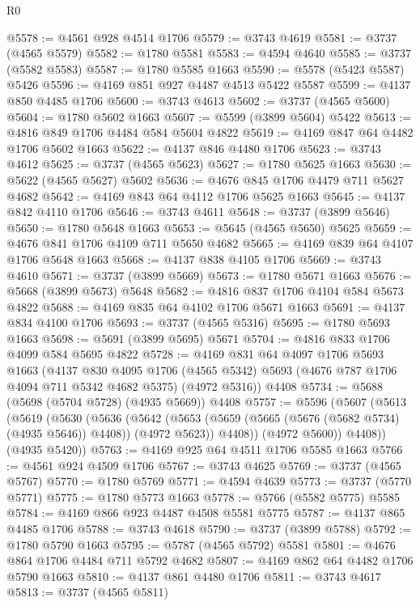 \begin{lexlean}{R0}
\begin{coremodule}
@5578 := @4561 @928 @4514 @1706
@5579 := @3743 @4619
@5581 := @3737 (@4565 @5579)
@5582 := @1780 @5581
@5583 := @4594 @4640
@5585 := @3737 (@5582 @5583)
@5587 := @1780 @5585 @1663
@5590 := @5578 (@5423 @5587) @5426
@5596 := @4169 @851 @927 @4487 @4513 @5422 @5587
@5599 := @4137 @850 @4485 @1706
@5600 := @3743 @4613
@5602 := @3737 (@4565 @5600)
@5604 := @1780 @5602 @1663
@5607 := @5599 (@3899 @5604) @5422
@5613 := @4816 @849 @1706 @4484 @584 @5604 @4822
@5619 := @4169 @847 @64 @4482 @1706 @5602 @1663
@5622 := @4137 @846 @4480 @1706
@5623 := @3743 @4612
@5625 := @3737 (@4565 @5623)
@5627 := @1780 @5625 @1663
@5630 := @5622 (@4565 @5627) @5602
@5636 := @4676 @845 @1706 @4479 @711 @5627 @4682
@5642 := @4169 @843 @64 @4112 @1706 @5625 @1663
@5645 := @4137 @842 @4110 @1706
@5646 := @3743 @4611
@5648 := @3737 (@3899 @5646)
@5650 := @1780 @5648 @1663
@5653 := @5645 (@4565 @5650) @5625
@5659 := @4676 @841 @1706 @4109 @711 @5650 @4682
@5665 := @4169 @839 @64 @4107 @1706 @5648 @1663
@5668 := @4137 @838 @4105 @1706
@5669 := @3743 @4610
@5671 := @3737 (@3899 @5669)
@5673 := @1780 @5671 @1663
@5676 := @5668 (@3899 @5673) @5648
@5682 := @4816 @837 @1706 @4104 @584 @5673 @4822
@5688 := @4169 @835 @64 @4102 @1706 @5671 @1663
@5691 := @4137 @834 @4100 @1706
@5693 := @3737 (@4565 @5316)
@5695 := @1780 @5693 @1663
@5698 := @5691 (@3899 @5695) @5671
@5704 := @4816 @833 @1706 @4099 @584 @5695 @4822
@5728 := @4169
    @831
    @64
    @4097
    @1706
    @5693
    @1663
    (@4137
      @830
      @4095
      @1706
      (@4565 @5342)
      @5693
      (@4676 @787 @1706 @4094 @711 @5342 @4682 @5375)
      (@4972 @5316))
    @4408
@5734 := @5688 (@5698 (@5704 @5728) (@4935 @5669)) @4408
@5757 := @5596
    (@5607
      (@5613
        (@5619
          (@5630
            (@5636
              (@5642
                (@5653 (@5659 (@5665 (@5676 (@5682 @5734) (@4935 @5646)) @4408)) (@4972 @5623))
                @4408))
            (@4972 @5600))
          @4408))
      (@4935 @5420))
@5763 := @4169 @925 @64 @4511 @1706 @5585 @1663
@5766 := @4561 @924 @4509 @1706
@5767 := @3743 @4625
@5769 := @3737 (@4565 @5767)
@5770 := @1780 @5769
@5771 := @4594 @4639
@5773 := @3737 (@5770 @5771)
@5775 := @1780 @5773 @1663
@5778 := @5766 (@5582 @5775) @5585
@5784 := @4169 @866 @923 @4487 @4508 @5581 @5775
@5787 := @4137 @865 @4485 @1706
@5788 := @3743 @4618
@5790 := @3737 (@3899 @5788)
@5792 := @1780 @5790 @1663
@5795 := @5787 (@4565 @5792) @5581
@5801 := @4676 @864 @1706 @4484 @711 @5792 @4682
@5807 := @4169 @862 @64 @4482 @1706 @5790 @1663
@5810 := @4137 @861 @4480 @1706
@5811 := @3743 @4617
@5813 := @3737 (@4565 @5811)

\end{coremodule}
\end{lexlean}
